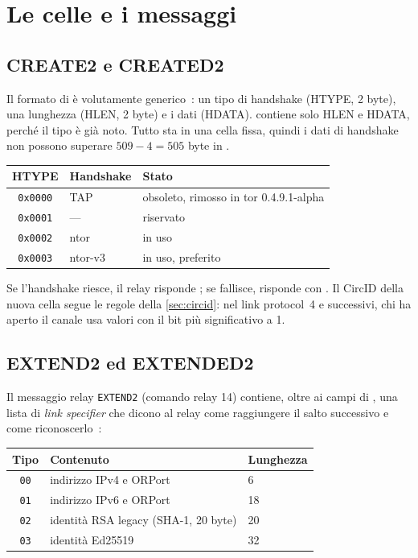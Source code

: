 \section{Le celle e i messaggi}\label{sec:circ-celle}

\subsection{CREATE2 e CREATED2}

Il formato di  è volutamente generico~: un tipo di handshake (HTYPE, 2 byte), una lunghezza (HLEN, 2 byte) e i dati (HDATA).  contiene solo HLEN e HDATA, perché il tipo è già noto. Tutto sta in una cella fissa, quindi i dati di handshake non possono superare $509 - 4 = 505$ byte in .

\begin{center}
\begin{tabular}{cll}
\toprule
HTYPE & Handshake & Stato \\
\midrule
\texttt{0x0000} & TAP & obsoleto, rimosso in tor 0.4.9.1-alpha \\
\texttt{0x0001} & --- & riservato \\
\texttt{0x0002} & ntor & in uso \\
\texttt{0x0003} & ntor-v3 & in uso, preferito \\
\bottomrule
\end{tabular}
\end{center}

Se l'handshake riesce, il relay risponde ; se fallisce, risponde con . Il CircID della nuova cella segue le regole della \cref{sec:circid}: nel link protocol~4 e successivi, chi ha aperto il canale usa valori con il bit più significativo a 1.

\subsection{EXTEND2 ed EXTENDED2}\label{sec:extend2}

Il messaggio relay \texttt{EXTEND2} (comando relay 14) contiene, oltre ai campi di , una lista di \emph{link specifier} che dicono al relay come raggiungere il salto successivo e come riconoscerlo~:

\begin{center}
\begin{tabular}{cll}
\toprule
Tipo & Contenuto & Lunghezza \\
\midrule
\texttt{00} & indirizzo IPv4 e ORPort & 6 \\
\texttt{01} & indirizzo IPv6 e ORPort & 18 \\
\texttt{02} & identità RSA legacy (SHA-1, 20 byte) & 20 \\
\texttt{03} & identità Ed25519 & 32 \\
\bottomrule
\end{tabular}
\end{center}

